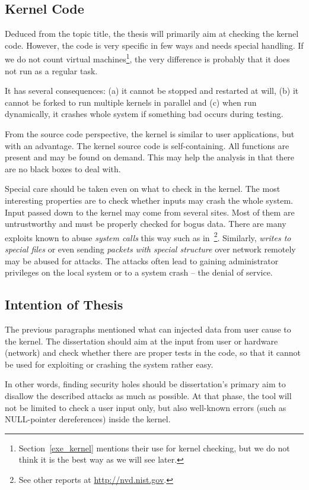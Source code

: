\documentclass[11pt,a4paper]{article}
\begin{document}
\subsection{Kernel Code}
Deduced from the topic title, the thesis will primarily aim at checking the
kernel code. However, the code is very specific in few ways and needs special
handling. If we do not count virtual machines\footnote{Section~\ref{exe_kernel}
mentions their use for kernel checking, but we do not think it is the best way
as we will see later.}, the very difference is probably that it does not run
as a regular task.

It has several consequences: (a) it cannot be stopped and restarted at will,
(b) it cannot be forked to run multiple kernels in parallel and (c) when run
dynamically, it crashes whole system if something bad occurs during testing.

From the source code perspective, the kernel is similar to user applications,
but with an advantage. The kernel source code is self-containing. All
functions are present and may be found on demand. This may help the analysis
in that there are no black boxes to deal with.

Special care should be taken even on what to check in the kernel. The most
interesting properties are to check whether inputs may crash the whole system.
Input passed down to the kernel may come from several sites. Most of them are
untrustworthy and must be properly checked for bogus data. There are many
exploits known to abuse \emph{system calls} this way such as
in~\cite{exploit_vmsplice,exploit_proto_ops,exploit_tun}\footnote{See other
reports at \url{http://nvd.nist.gov}.}. Similarly, \emph{writes to special
files} or even sending \emph{packets with special structure} over network
remotely may be abused for attacks. The attacks often lead to gaining
administrator privileges on the local system or to a system crash -- the
denial of service.

\subsection{Intention of Thesis}
The previous paragraphs mentioned what can injected data from user cause to
the kernel. The dissertation should aim at the input from user or hardware
(network) and check whether there are proper tests in the code, so that it
cannot be used for exploiting or crashing the system rather easy.

In other words, finding security holes should be dissertation's primary aim to
disallow the described attacks as much as possible. At that phase, the tool
will not be limited to check a user input only, but also well-known errors
(such as NULL-pointer dereferences) inside the kernel.
\end{document}
